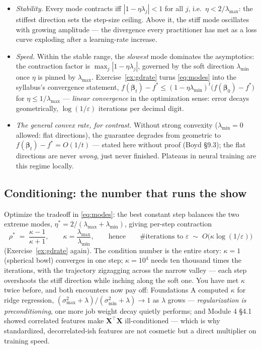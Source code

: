 \documentclass[11pt]{article}
\numberwithin{equation}{section}
\theoremstyle{plain}
\theoremstyle{definition}
\theoremstyle{remark}
\newcommand{\X}{\bm{X}}
\newcommand{\bbeta}{\bm{\beta}}
\newcommand{\T}{\top}
\newcommand{\lmax}{\lambda_{\max}}
\newcommand{\lmin}{\lambda_{\min}}
\begin{document}
\begin{itemize}[leftmargin=2em,itemsep=0.15em]
\item \emph{Stability.} Every mode contracts iff $|1 - \eta\lambda_j| < 1$ for all $j$, i.e.\ $\eta < 2/\lmax$: the stiffest direction sets the step-size ceiling. Above it, the stiff mode oscillates with growing amplitude --- the divergence every practitioner has met as a loss curve exploding after a learning-rate increase.
\item \emph{Speed.} Within the stable range, the \emph{slowest} mode dominates the asymptotics: the contraction factor is $\max_j |1 - \eta\lambda_j|$, governed by the soft direction $\lmin$ once $\eta$ is pinned by $\lmax$. Exercise~\ref{ex:gdrate} turns \eqref{eq:modes} into the syllabus's convergence statement, $f(\bbeta_t) - f^\ast \le (1 - \eta\lmin)^t\big(f(\bbeta_0) - f^\ast\big)$ for $\eta \le 1/\lmax$ --- \emph{linear convergence} in the optimization sense: error decays geometrically, $\log(1/\varepsilon)$ iterations per decimal digit.
\item \emph{The general convex rate, for contrast.} Without strong convexity ($\lmin = 0$ allowed: flat directions), the guarantee degrades from geometric to $f(\bbeta_t) - f^\ast = O(1/t)$ --- stated here without proof (Boyd \S9.3); the flat directions are never \emph{wrong}, just never finished. Plateaus in neural training are this regime locally.
\end{itemize}

\subsection{Conditioning: the number that runs the show}\label{sec:conditioning}

Optimize the tradeoff in \eqref{eq:modes}: the best constant step balances the two extreme modes, $\eta^\ast = 2/(\lmax + \lmin)$, giving per-step contraction
\begin{equation}
\rho^\ast \;=\; \frac{\kappa - 1}{\kappa + 1},
\qquad \kappa = \frac{\lmax}{\lmin},
\qquad\text{hence}\qquad
\#\text{iterations to } \varepsilon \;\sim\; O\big(\kappa \log(1/\varepsilon)\big)
\label{eq:kappa}
\end{equation}
(Exercise~\ref{ex:gdrate} again). The condition number is the entire story: $\kappa = 1$ (spherical bowl) converges in one step; $\kappa = 10^4$ needs ten thousand times the iterations, with the trajectory zigzagging across the narrow valley --- each step overshoots the stiff direction while inching along the soft one. You have met $\kappa$ twice before, and both encounters now pay off: Foundations A computed $\kappa$ for ridge regression, $(\sigma_{\max}^2 + \lambda)/(\sigma_{\min}^2 + \lambda) \to 1$ as $\lambda$ grows --- \emph{regularization is preconditioning}, one more job weight decay quietly performs; and Module 4 \S4.1 showed correlated features make $\X^\T\X$ ill-conditioned --- which is why standardized, decorrelated-ish features are not cosmetic but a direct multiplier on training speed.
\end{document}
